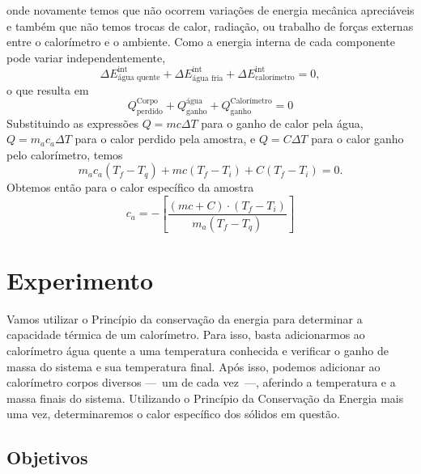 \noindent{}onde novamente temos que não ocorrem variações de energia mecânica apreciáveis e também que não temos trocas de calor, radiação, ou trabalho de forças externas entre o calorímetro e o ambiente. Como a energia interna de cada componente pode variar independentemente,
\begin{equation}
    \Delta E_{\text{água quente}}^{\text{int}} + \Delta E_{\text{água fria}}^{\text{int}} + \Delta E_{\text{calorímetro}}^{\text{int}} = 0,
\end{equation}
%
o que resulta em
\begin{equation}
	Q^{\text{Corpo}}_{\text{perdido}} + Q^{\text{água}}_{\text{ganho}} + Q^{\text{Calorímetro}}_{\text{ganho}} = 0
\end{equation}
%
Substituindo as expressões $Q = m c \Delta T$ para o ganho de calor pela água, $Q = m_a c_a \Delta T$ para o calor perdido pela amostra, e $Q = C\Delta T$ para o calor ganho pelo calorímetro, temos
\begin{equation}
	m_a c_a (T_f - T_q) + m c (T_f - T_i) + C (T_f-T_i) = 0.
\end{equation}
%
Obtemos então para o calor específico da amostra
\begin{equation}
	c_a = - \left[\frac{(mc + C)\cdot(T_f - T_i)}{m_a (T_f - T_q)}\right]
\end{equation}

\section{Experimento}

Vamos utilizar o Princípio da conservação da energia para determinar a capacidade térmica de um calorímetro. Para isso, basta adicionarmos ao calorímetro água quente a uma temperatura conhecida e verificar o ganho de massa do sistema e sua temperatura final. Após isso, podemos adicionar ao calorímetro corpos diversos ---~um de cada vez~---, aferindo a temperatura e a massa finais do sistema. Utilizando o Princípio da Conservação da Energia mais uma vez, determinaremos o calor específico dos sólidos em questão.

\subsection{Objetivos}
\label{Sec:ObjetivosCalorEspecifico}

